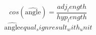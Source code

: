 \[cos(\widehat{{\text{{{angle}}}}})=\frac{{{adj_length}}}{{{hyp_length}}}\]
\[\widehat{{\text{{{angle}}}}}{equal_sign}{result_with_unit}\]
